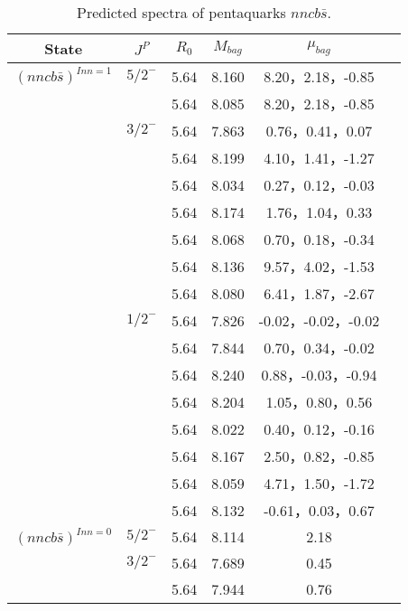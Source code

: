 \documentclass[prd,twocolumn,floatfix,nofootinbib]{revtex4}
\begin{document}
\begin{table*}[!htbp]
    \caption{Predicted spectra of pentaquarks $nncb\bar{s }$.}
    \begin{tabular}{cccccc}
        \hline\hline
        {\rm State} &$J^{P}$ &$R_{0}$ &$M_{bag}$ &$\mu_{bag}$  \\ \hline
        ${(nncb\bar{s})}^{I{nn}=1}$
            &${5/2}^{-}$     &5.64   &8.160 &8.20，2.18，-0.85 \\ 
                         &$ $     &5.64   &8.085 &8.20，2.18，-0.85 \\   
            &${3/2}^{-}$     &5.64   &7.863 &0.76，0.41，0.07\\
                         &$ $     &5.64   &8.199 &4.10，1.41，-1.27  \\
                         &$ $     &5.64   &8.034 &0.27，0.12，-0.03  \\
                         &$ $     &5.64   &8.174 &1.76，1.04，0.33 \\
                         &$ $     &5.64   &8.068 &0.70，0.18，-0.34  \\
                         &$ $     &5.64   &8.136 &9.57，4.02，-1.53  \\
                         &$ $     &5.64   &8.080 &6.41，1.87，-2.67 \\                        
            &${1/2}^{-}$     &5.64   &7.826 &-0.02，-0.02，-0.02  \\
                         &$ $     &5.64   &7.844 &0.70，0.34，-0.02  \\
                         &$ $     &5.64   &8.240 &0.88，-0.03，-0.94  \\
                         &$ $     &5.64   &8.204 &1.05，0.80，0.56 \\
                         &$ $     &5.64   &8.022 &0.40，0.12，-0.16  \\
                         &$ $     &5.64   &8.167 &2.50，0.82，-0.85 \\
                         &$ $     &5.64   &8.059 &4.71，1.50，-1.72 \\                         
                         &$ $     &5.64   &8.132 &-0.61，0.03，0.67 \\                          
            ${(nncb\bar{s})}^{I{nn}=0}$
            &${5/2}^{-}$     &5.64   &8.114 &2.18 \\                
            &${3/2}^{-}$     &5.64   &7.689 &0.45 \\
                         &$ $     &5.64   &7.944 &0.76  \\

\end{tabular}
\end{table*}
\end{document}
